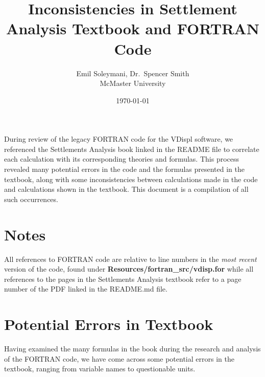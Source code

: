 \documentclass[11pt,fleqn]{article}
\newcommand{\indentpar}{\phantom{=}}
\begin{document}
      
      \title{Inconsistencies in Settlement Analysis Textbook and FORTRAN Code}
      \date{\today}
      \author{Emil Soleymani, Dr.~Spencer Smith\\ McMaster University}
      \maketitle

      \medskip

      \indentpar During review of the legacy FORTRAN code for the VDispl software, 
      we referenced the Settlements Analysis book linked in the README 
      file to correlate each calculation with its corresponding 
      theories and formulas. This process revealed many potential errors 
      in the code and the formulas presented in the textbook, along with 
      some inconsistencies between calculations made in the code and 
      calculations shown in the textbook. This document is a compilation 
      of all such occurrences.
      
    
    \pagebreak
    

    \section*{Notes}
    \indentpar All references to FORTRAN code are relative to line numbers 
    in the \emph{most recent} version of the code, found under 
    \textbf{Resources/fortran\_src/vdisp.for} while all references to the pages
    in the Settlements Analysis textbook refer to a page number of the PDF linked 
    in the README.md file.

    
    \medskip

    \section*{Potential Errors in Textbook}

    \indentpar Having examined the many formulas in the book during the research and 
    analysis of the FORTRAN code, we have come across some potential errors in the
    textbook, ranging from variable names to questionable units.
   
\end{document}
